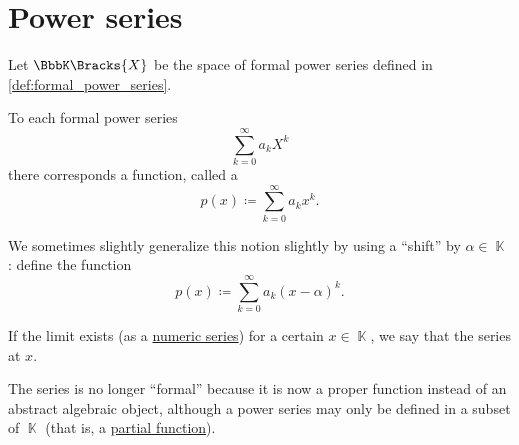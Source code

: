 \section{Power series}\label{sec:power_series}

\begin{definition}\label{def:convergent_power_series}
  Let \( \BbbK\Bracks{X} \) be the space of formal power series defined in \cref{def:formal_power_series}.

  To each formal power series
  \begin{equation*}
    \sum_{k=0}^\infty a_k X^k
  \end{equation*}
  there corresponds a function, called a 
  \begin{equation}\label{def:convergent_power_series/series}
    p(x) \coloneqq \sum_{k=0}^\infty a_k x^k.
  \end{equation}

  We sometimes slightly generalize this notion slightly by using a \enquote{shift} by \( \alpha \in \BbbK \): define the function
  \begin{equation}\label{def:convergent_power_series/shifted_series}
    p(x) \coloneqq \sum_{k=0}^\infty a_k (x - \alpha)^k.
  \end{equation}

  If the limit exists (as a \hyperref[def:convergent_series]{numeric series}) for a certain \( x \in \BbbK \), we say that the series  at \( x \).

  The series is no longer \enquote{formal} because it is now a proper function instead of an abstract algebraic object, although a power series may only be defined in a subset of \( \BbbK \) (that is, a \hyperref[def:partial_function]{partial function}).
\end{definition}

